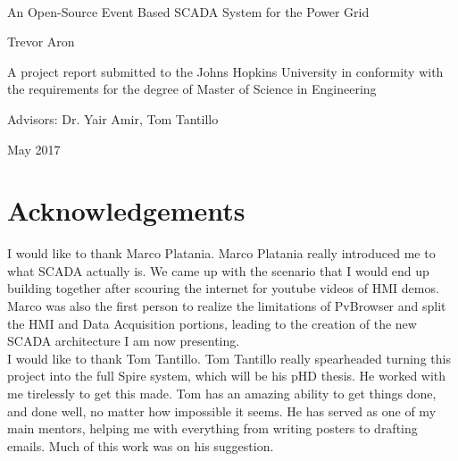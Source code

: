 \documentclass[11pt,a4paper,oldfontcommands]{memoir}
\begin{document}
%
%
\thispagestyle{empty}

{%
\sffamily
\centering
\Large
~\vspace{\fill}

{\huge 
An Open-Source Event Based SCADA System for the Power Grid
}

\vspace{2.5cm}

{\LARGE
Trevor Aron
}

\vspace{3.5cm}

A project report submitted to the Johns Hopkins University in
conformity with the requirements for the degree of Master 
of Science in Engineering\\ 

\vspace{3.5cm}

Advisors: Dr. Yair Amir, Tom Tantillo

\vspace{\fill}

May 2017

}%


\chapter{Acknowledgements}

\indent \indent I would like to thank Marco Platania. Marco Platania really introduced me to
what SCADA actually is. We came up with the scenario that I would end up building
together after scouring the internet for youtube videos of HMI demos. Marco
was also the first person to realize the limitations of PvBrowser and split
the HMI and Data Acquisition portions, leading to the creation of the new SCADA 
architecture I am now presenting. \\

\indent I would like to thank Tom Tantillo. Tom Tantillo really spearheaded turning
this project into the full Spire system, which will be his pHD thesis. He worked
with me tirelessly to get this made. Tom has an amazing ability to get things
done, and done well, no matter how impossible it seems.
He has served as one of my main mentors, helping me with everything from 
writing posters to drafting emails. Much of this
work was on his suggestion. \\
\end{document}
